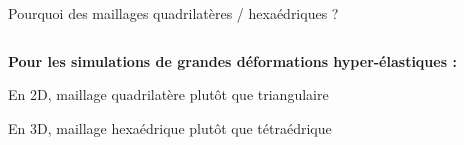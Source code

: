 \begin{frame}{Pourquoi des maillages quadrilatères / hexaédriques ?}
    \begin{columns}[T] %
        \begin{column}{.4\textwidth}
            \textbf{Pour les simulations de grandes déformations hyper-élastiques :}

            \begin{itemize}
                \item En 2D, maillage quadrilatère plutôt que triangulaire
                 {\item En 3D, maillage hexaédrique plutôt que tétraédrique}
            \end{itemize}
        \end{column}%
        

\end{columns}
\end{frame}
